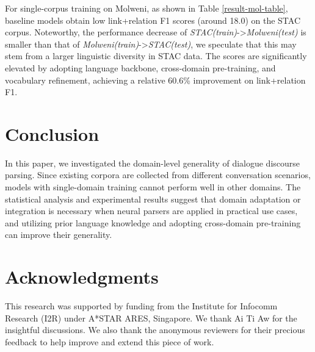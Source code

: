 \documentclass[11pt]{article}
\begin{document}
For single-corpus training on Molweni, as shown in Table \ref{result-mol-table}, baseline models obtain low link+relation F1 scores (around 18.0) on the STAC corpus. 
Noteworthy, the performance decrease of  \textit{STAC(train)}->\textit{Molweni(test)} is smaller than that of \textit{Molweni(train)}->\textit{STAC(test)}, we speculate that this may stem from a larger linguistic diversity in STAC data.
The scores are significantly elevated by adopting language backbone, cross-domain pre-training, and vocabulary refinement, achieving a relative 60.6\% improvement on link+relation F1.

\section{Conclusion}
In this paper, we investigated the domain-level generality of dialogue discourse parsing. Since existing corpora are collected from different conversation scenarios, models with single-domain training cannot perform well in other domains. The statistical analysis and experimental results suggest that domain adaptation or integration is necessary when neural parsers are applied in practical use cases, and utilizing prior language knowledge and adopting cross-domain pre-training can improve their generality.

\section*{Acknowledgments}
This research was supported by funding from the Institute for Infocomm Research (I2R) under A*STAR ARES, Singapore. We thank Ai Ti Aw for the insightful discussions. We also thank the anonymous reviewers for their precious feedback to help improve and extend this piece of work.




\newpage

\appendix
\end{document}
